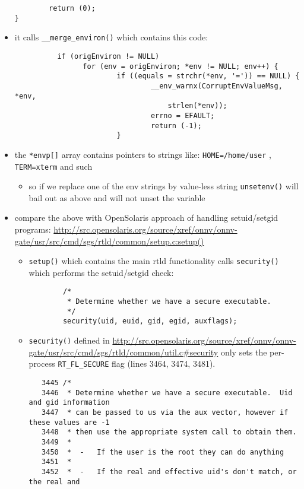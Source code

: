 \begin{itemize}
\begin{verbatim}
        return (0);
}
\end{verbatim}
  \item it calls \texttt{\_\_merge\_environ()} which contains this code:
\begin{verbatim}
          if (origEnviron != NULL)
                for (env = origEnviron; *env != NULL; env++) {
                        if ((equals = strchr(*env, '=')) == NULL) {
                                __env_warnx(CorruptEnvValueMsg, *env,
                                    strlen(*env));
                                errno = EFAULT;
                                return (-1);
                        }
\end{verbatim}
	  \item the \texttt{*envp[]} array contains pointers to strings like:
	    \texttt{HOME=/home/user} , \texttt{TERM=xterm} and such
	    \begin{itemize}
	    \item so if we replace one of the env strings by value-less string
	      \texttt{unsetenv()} will bail out as above and will not unset the
	      variable
	    \end{itemize}
  \item compare the above with OpenSolaris approach of handling setuid/setgid
	    programs:
\url{http://src.opensolaris.org/source/xref/onnv/onnv-gate/usr/src/cmd/sgs/rtld/common/setup.c:setup()}
  \begin{itemize}
   \item \texttt{setup()} which contains the main rtld functionality calls
   \texttt{security()} which performs the setuid/setgid check:
\begin{verbatim}
     	/*
     	 * Determine whether we have a secure executable.
     	 */
     	security(uid, euid, gid, egid, auxflags);
\end{verbatim}
  \item \texttt{security()} defined in
\url{http://src.opensolaris.org/source/xref/onnv/onnv-gate/usr/src/cmd/sgs/rtld/common/util.c#security}
  only sets the per-process \texttt{RT\_FL\_SECURE} flag
  (lines 3464, 3474, 3481).
\begin{verbatim}
   3445 /*
   3446  * Determine whether we have a secure executable.  Uid and gid information
   3447  * can be passed to us via the aux vector, however if these values are -1
   3448  * then use the appropriate system call to obtain them.
   3449  *
   3450  *  -	If the user is the root they can do anything
   3451  *
   3452  *  -	If the real and effective uid's don't match, or the real and

\end{verbatim}
\end{itemize}
\end{itemize}
